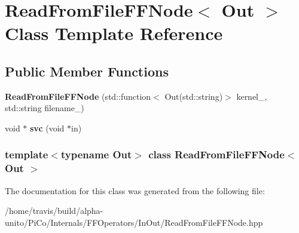 \hypertarget{class_read_from_file_f_f_node}{\section{\-Read\-From\-File\-F\-F\-Node$<$ \-Out $>$ \-Class \-Template \-Reference}
\label{class_read_from_file_f_f_node}
}
\subsection*{\-Public \-Member \-Functions}
\begin{DoxyCompactItemize}
\item 
\hypertarget{class_read_from_file_f_f_node_abf7a8aa34e88a9ce0e4767d84363156f}{{\bfseries \-Read\-From\-File\-F\-F\-Node} (std\-::function$<$ \-Out(std\-::string)$>$ kernel\-\_\-, std\-::string filename\-\_\-)}\label{class_read_from_file_f_f_node_abf7a8aa34e88a9ce0e4767d84363156f}

\item 
\hypertarget{class_read_from_file_f_f_node_a0fb617afdb7e1313509aa92caa1b9856}{void $\ast$ {\bfseries svc} (void $\ast$in)}\label{class_read_from_file_f_f_node_a0fb617afdb7e1313509aa92caa1b9856}

\end{DoxyCompactItemize}
\subsubsection*{template$<$typename \-Out$>$ class Read\-From\-File\-F\-F\-Node$<$ Out $>$}



\-The documentation for this class was generated from the following file\-:\begin{DoxyCompactItemize}
\item 
/home/travis/build/alpha-\/unito/\-Pi\-Co/\-Internals/\-F\-F\-Operators/\-In\-Out/\-Read\-From\-File\-F\-F\-Node.\-hpp\end{DoxyCompactItemize}
